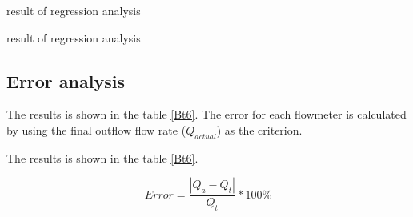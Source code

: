 \begin{minipage}[h]{\textwidth}
  \begin{minipage}[h]{0.49\textwidth}
    \makeatletter{}
    \centering
    \caption{result of regression analysis}
    \label{Bt5} 
  \end{minipage}
  \begin{minipage}{0.49\textwidth}
    \makeatletter{}
    \centering
    \caption{result of regression analysis}
    \label{Bt6}
  \end{minipage}  
\end{minipage}




\subsection{Error analysis}
The results is shown in the table \ref{Bt6}.
The error for each flowmeter is calculated 
by using the final outflow flow rate ($Q_{actual}$) as the criterion.

The results is shown in the table \ref{Bt6}.

\begin{equation}
    Error=\frac{|Q_a-Q_t|}{Q_t}*100\%
    \label{Be9}
\end{equation}

\FloatBarrier
